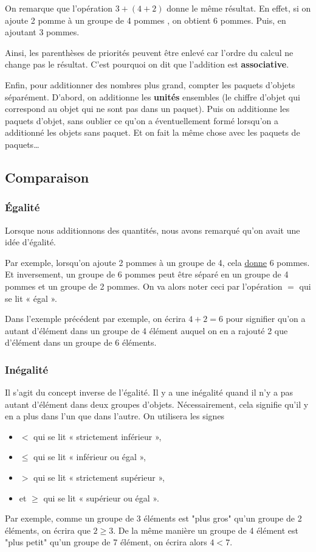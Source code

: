 On remarque que l'opération $3+(4+2)$ donne le même résultat. En effet, si on ajoute 2 pomme à un groupe de 4 pommes , on obtient 6 pommes. Puis, en ajoutant 3 pommes.

Ainsi, les parenthèses de priorités peuvent être enlevé car l'ordre du calcul ne change pas le résultat. C'est pourquoi on dit que l'addition est \textbf{associative}.

Enfin, pour additionner des nombres plus grand, compter les paquets d'objets séparément. D'abord, on additionne les \textbf{unités} ensembles (le chiffre d'objet qui correspond au objet qui ne sont pas dans un paquet). Puis on additionne les paquets d'objet, sans oublier ce qu'on a éventuellement formé lorsqu'on a additionné les objets sans paquet. Et on fait la même chose avec les paquets de paquets\dots

\subsection{Comparaison}
\subsubsection{Égalité}
Lorsque nous additionnons des quantités, nous avons remarqué qu'on avait une idée d'égalité. 

Par exemple, lorsqu'on ajoute 2 pommes à un groupe de 4, cela \underline{donne} 6 pommes. Et inversement, un groupe de 6 pommes peut être séparé en un groupe de 4 pommes et un groupe de 2 pommes.
On va alors noter ceci par l'opération $=$ qui se lit « égal ». 

Dans l'exemple précédent par exemple, on écrira $4+2 = 6$ pour signifier qu'on a autant d'élément dans un groupe de 4 élément auquel on en a rajouté 2 que d'élément dans un groupe de 6 éléments.

\subsubsection{Inégalité}
Il s'agit du concept inverse de l'égalité. Il y a une inégalité quand il n'y a pas autant d'élément dans deux groupes d'objets. Nécessairement, cela signifie qu'il y en a plus dans l'un que dans l'autre. On utilisera les signes 
\begin{itemize}
\item $<$ qui se lit « strictement inférieur »,
\item $\le$ qui se lit « inférieur ou égal »,
\item $>$ qui se lit « strictement supérieur »,
\item et $\ge$ qui se lit « supérieur ou égal ».
\end{itemize}
Par exemple, comme un groupe de 3 éléments est "plus gros" qu'un groupe de 2 éléments, on écrira que $2 \ge 3$. De la même manière un groupe de 4 élément est "plus petit" qu'un groupe de 7 élément, on écrira alors $4 < 7$.

